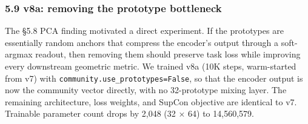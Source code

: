 \documentclass[
  11pt]{article}
\begin{document}
\subsubsection{5.9 v8a: removing the prototype
bottleneck}\label{v8a-removing-the-prototype-bottleneck}

The §5.8 PCA finding motivated a direct experiment. If the prototypes
are essentially random anchors that compress the encoder's output
through a soft-argmax readout, then removing them should preserve task
loss while improving every downstream geometric metric. We trained v8a
(10K steps, warm-started from v7) with
\texttt{community.use\_prototypes=False}, so that the encoder output is
now the community vector directly, with no 32-prototype mixing layer.
The remaining architecture, loss weights, and SupCon objective are
identical to v7. Trainable parameter count drops by 2,048 (32 × 64) to
14,560,579.
\end{document}
